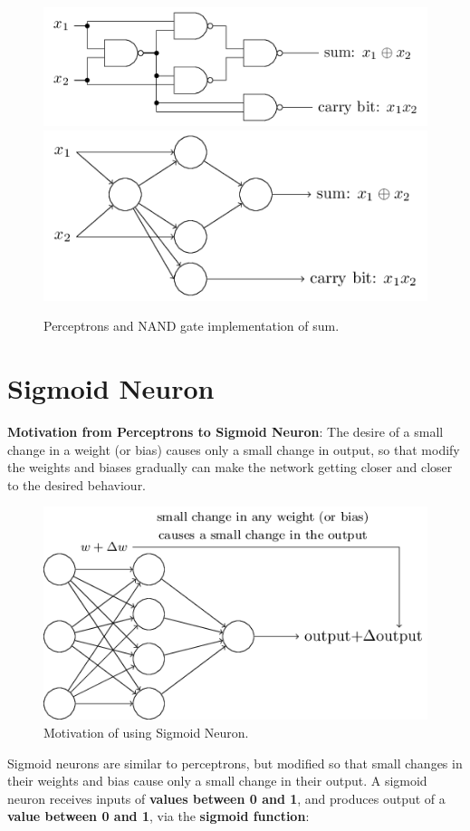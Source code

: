 \documentclass[]{book}
\begin{document}
\begin{figure}

{\centering \includegraphics[width=0.5\linewidth]{fig/01_tikz03} \includegraphics[width=0.5\linewidth]{fig/01_tikz04} 

}

\caption{Perceptrons and NAND gate implementation of sum.}\label{fig:nnhd-pptn-nand-sum}
\end{figure}

\section{Sigmoid Neuron}\label{sigmoid-neuron}

\textbf{Motivation from Perceptrons to Sigmoid Neuron}: The desire of a
small change in a weight (or bias) causes only a small change in output,
so that modify the weights and biases gradually can make the network
getting closer and closer to the desired behaviour.

\begin{figure}

{\centering \includegraphics[width=0.7\linewidth]{fig/01_tikz08} 

}

\caption{Motivation of using Sigmoid Neuron.}\label{fig:nnhd-sn-motivation}
\end{figure}

Sigmoid neurons are similar to perceptrons, but modified so that small
changes in their weights and bias cause only a small change in their
output. A sigmoid neuron receives inputs of \textbf{values between 0 and
1}, and produces output of a \textbf{value between 0 and 1}, via the
\textbf{sigmoid function}:
\end{document}
